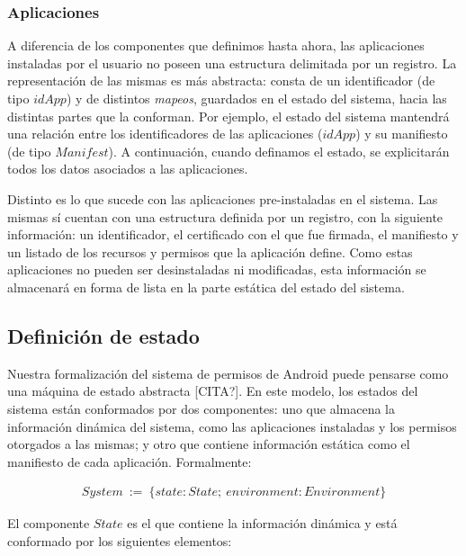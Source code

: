 \subsubsection*{Aplicaciones}
A diferencia de los componentes que definimos hasta ahora, las aplicaciones instaladas por el
usuario no poseen una estructura delimitada por un registro. La representación de las mismas es más
abstracta: consta de un identificador (de tipo $idApp$) y de distintos \textit{mapeos}, guardados en
el estado del sistema, hacia las distintas partes que la conforman. Por ejemplo, el estado del
sistema mantendrá una relación entre los identificadores de las aplicaciones ($idApp$) y su
manifiesto (de tipo $Manifest$). A continuación, cuando definamos el estado, se explicitarán todos
los datos asociados a las aplicaciones.

Distinto es lo que sucede con las aplicaciones pre-instaladas en el sistema. Las mismas sí cuentan
con una estructura definida por un registro, con la siguiente información: un identificador, el
certificado con el que fue firmada, el manifiesto y un listado de los recursos y permisos que la
aplicación define. Como estas aplicaciones no pueden ser desinstaladas ni modificadas, esta
información se almacenará en forma de lista en la parte estática del estado del sistema.

\subsection{Definición de estado}
Nuestra formalización del sistema de permisos de Android puede pensarse como una máquina de estado
abstracta [CITA?]. En este modelo, los estados del sistema están conformados por dos componentes:
uno que almacena la información dinámica del sistema, como las aplicaciones instaladas y los
permisos otorgados a las mismas; y otro que contiene información estática como el manifiesto de cada
aplicación. Formalmente:

\begin{align*}
    System\ :=\ \{ state: State;\ environment: Environment \}
\end{align*}


El componente $State$ es el que contiene la información dinámica y está conformado por los
siguientes elementos:

